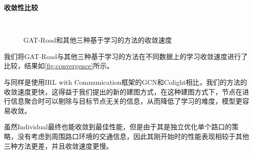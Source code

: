 \textbf{收敛性比较}
\begin{figure}[t]
  \label{fig:convergence}
  \quad
  \\
  \quad
  \caption[]{GAT-Road和其他三种基于学习的方法的收敛速度}
\end{figure}

我们将GAT-Road与其他三种基于学习的方法在不同数据上的学习收敛速度进行了比较，结果如\autoref{fig:convergence}所示。

与同样是使用IRL with Communication框架的GCN和Colight相比，我们的方法的收敛速度更快，这得益于我们提出的新的建图方式，在这种建图方式下，节点在进行信息聚合时可以剔除与目标节点无关的信息，从而降低了学习的难度，模型更容易收敛。

虽然Individual最终也能收敛到最佳性能，但是由于其是独立优化单个路口的策略，没有考虑到周围路口环境的交通信息，因此其刚开始时的性能表现相较于其他三种方法更差，并且收敛速度更慢。
